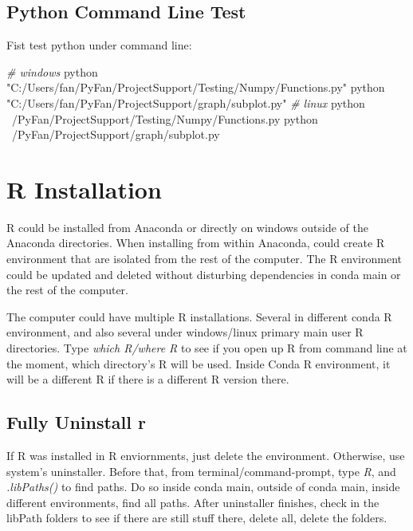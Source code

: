 \documentclass[]{article}
\newenvironment{Shaded}{\begin{snugshade}}{\end{snugshade}}
\newcommand{\CommentTok}[1]{\textcolor[rgb]{0.56,0.35,0.01}{\textit{#1}}}
\newcommand{\ExtensionTok}[1]{#1}
\newcommand{\NormalTok}[1]{#1}
\newcommand{\StringTok}[1]{\textcolor[rgb]{0.31,0.60,0.02}{#1}}
\begin{document}
\hypertarget{python-command-line-test}{%
\subsection{Python Command Line Test}\label{python-command-line-test}}

Fist test python under command line:

\begin{Shaded}
\begin{Highlighting}[]
\CommentTok{# windows}
\ExtensionTok{python} \StringTok{"C:/Users/fan/PyFan/ProjectSupport/Testing/Numpy/Functions.py"}
\ExtensionTok{python} \StringTok{"C:/Users/fan/PyFan/ProjectSupport/graph/subplot.py"}
\CommentTok{# linux}
\ExtensionTok{python}\NormalTok{ ~/PyFan/ProjectSupport/Testing/Numpy/Functions.py}
\ExtensionTok{python}\NormalTok{ ~/PyFan/ProjectSupport/graph/subplot.py}
\end{Highlighting}
\end{Shaded}

\hypertarget{r-installation}{%
\section{R Installation}\label{r-installation}}

R could be installed from Anaconda or directly on windows outside of the
Anaconda directories. When installing from within Anaconda, could create
R environment that are isolated from the rest of the computer. The R
environment could be updated and deleted without disturbing dependencies
in conda main or the rest of the computer.

The computer could have multiple R installations. Several in different
conda R environment, and also several under windows/linux primary main
user R directories. Type \emph{which R/where R} to see if you open up R
from command line at the moment, which directory's R will be used.
Inside Conda R environment, it will be a different R if there is a
different R version there.

\hypertarget{fully-uninstall-r}{%
\subsection{Fully Uninstall r}\label{fully-uninstall-r}}

If R was installed in R enviornments, just delete the environment.
Otherwise, use system's uninstaller. Before that, from
terminal/command-prompt, type \emph{R}, and \emph{.libPaths()} to find
paths. Do so inside conda main, outside of conda main, inside different
environments, find all paths. After uninstaller finishes, check in the
libPath folders to see if there are still stuff there, delete all,
delete the folders.
\end{document}
